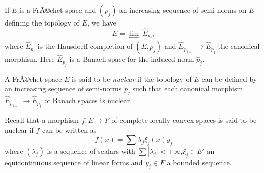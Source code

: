 \documentclass[12pt]{article}
\begin{document}
If $E$ is a FrÃ©chet space and $(p_j)$ an increasing sequence of semi-norms on $E$ defining the topology of $E$, we have
$$
E=\underset{\longleftarrow}{\lim}\,\widehat E_{p_j},
$$
where $\widehat E_{p_j}$ is the Hausdorff completion of $(E,p_j)$ and $\widehat E_{p_{j+1}}\to\widehat E_{p_j}$ the canonical morphism. Here $\widehat E_{p_j}$ is a Banach space for the induced norm $\widehat p_j$.

A FrÃ©chet space $E$ is said to be \emph{nuclear} if the topology of $E$ can be defined by an increasing sequence of semi-norms $p_j$ such that each canonical morphism $\widehat E_{p_{j+1}}\to\widehat E_{p_j}$ of Banach spaces is nuclear.

Recall that a morphism $f\colon E\to F$ of complete locally convex spaces is said to be nuclear if $f$ can be written as
$$
f(x)=\sum\lambda_j\xi_j(x)y_j
$$
where $(\lambda_j)$ is a sequence of scalars with $\sum|\lambda_j|<+\infty$,$\xi_j\in E'$ an equicontinuous sequence of linear forms and $y_j\in F$ a bounded sequence.
\end{document}

